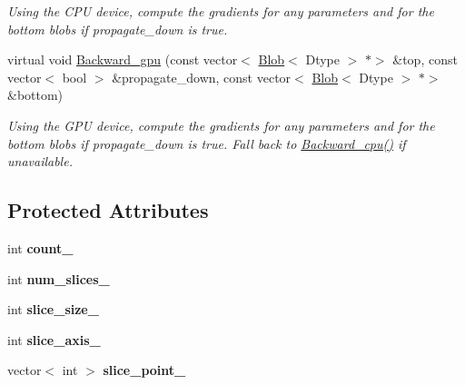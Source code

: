 \begin{DoxyCompactItemize}
\begin{DoxyCompactList}\small\item\em Using the C\+PU device, compute the gradients for any parameters and for the bottom blobs if propagate\+\_\+down is true. \end{DoxyCompactList}\item 
\mbox{\label{classcaffe_1_1_slice_layer_a6daa65218a8bfaa3337800730ba67977}} 
virtual void \mbox{\hyperlink{classcaffe_1_1_slice_layer_a6daa65218a8bfaa3337800730ba67977}{Backward\+\_\+gpu}} (const vector$<$ \mbox{\hyperlink{classcaffe_1_1_blob}{Blob}}$<$ Dtype $>$ $\ast$$>$ \&top, const vector$<$ bool $>$ \&propagate\+\_\+down, const vector$<$ \mbox{\hyperlink{classcaffe_1_1_blob}{Blob}}$<$ Dtype $>$ $\ast$$>$ \&bottom)
\begin{DoxyCompactList}\small\item\em Using the G\+PU device, compute the gradients for any parameters and for the bottom blobs if propagate\+\_\+down is true. Fall back to \mbox{\hyperlink{classcaffe_1_1_slice_layer_aa6a718baa3285540f2b2d17ebf39447e}{Backward\+\_\+cpu()}} if unavailable. \end{DoxyCompactList}\end{DoxyCompactItemize}
\subsection*{Protected Attributes}
\begin{DoxyCompactItemize}
\item 
\mbox{\label{classcaffe_1_1_slice_layer_ad5f5a2a02b1f5b97b4ec8e1a2588b094}} 
int {\bfseries count\+\_\+}
\item 
\mbox{\label{classcaffe_1_1_slice_layer_adddb440fcfcad67619a3cfb914298e73}} 
int {\bfseries num\+\_\+slices\+\_\+}
\item 
\mbox{\label{classcaffe_1_1_slice_layer_a8d12bb77a960c76b9f521c3df70fb206}} 
int {\bfseries slice\+\_\+size\+\_\+}
\item 
\mbox{\label{classcaffe_1_1_slice_layer_a214fca5452dfa0bc63d3e51c0b9118ea}} 
int {\bfseries slice\+\_\+axis\+\_\+}
\item 
\mbox{\label{classcaffe_1_1_slice_layer_adbaa13980187382d09a4dac8492f7fd2}} 
vector$<$ int $>$ {\bfseries slice\+\_\+point\+\_\+}
\end{DoxyCompactItemize}


